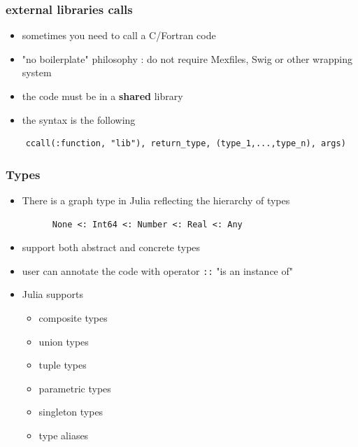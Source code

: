 \documentclass[11pt,mathserif]{beamer}
\newcommand{\julia}{{ Julia}{} }
\begin{document}
\begin{frame}[fragile]
  \frametitle{external libraries calls}
  \pause
  \begin{itemize}[<+->]
    \item sometimes you need to call a C/Fortran code
    \item "no boilerplate" philosophy : do not require { Mexfiles}, Swig or other wrapping system
    \item the code must be in a {\bf shared} library 
    \item the syntax is the following  
  \end{itemize}
  \pause
  \begin{lstlisting}
    ccall(:function, "lib"), return_type, (type_1,...,type_n), args)
  \end{lstlisting}
\end{frame}


\begin{frame}[fragile]
  \frametitle{Types}
  \pause
  \begin{itemize}[<+->]
    \item There is a graph type in Julia reflecting the hierarchy of types
    \begin{lstlisting}
      None <: Int64 <: Number <: Real <: Any
    \end{lstlisting}
      \item support both abstract and concrete types
      \item user can annotate the code with operator \texttt{::} "is an instance of"
      \item \julia supports 
    \begin{itemize}
      \item composite types
      \item union types  
      \item tuple types  
      \item parametric types
      \item singleton types
      \item type aliases
    \end{itemize}
  \end{itemize}
\end{frame}
\end{document}
